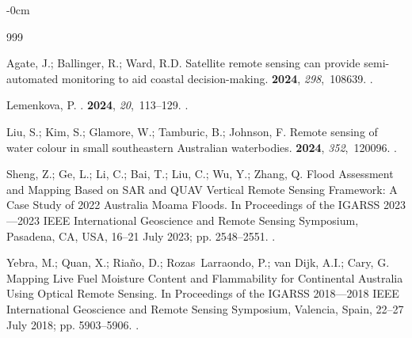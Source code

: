 \documentclass[jmse,article,accept,pdftex,oneauthor]{Definitions/mdpi}
\begin{document}
\begin{adjustwidth}{-\extralength}{0cm}


%
\begin{thebibliography}{999}

Agate, J.; Ballinger, R.; Ward, R.D.
\newblock Satellite remote sensing can provide semi-automated monitoring to aid
  coastal decision-making.
 {\bf 2024}, {\em
  298},~108639.
.

Lemenkova, P.
.
 {\bf 2024}, {\em 20},~113--129.
.

Liu, S.; Kim, S.; Glamore, W.; Tamburic, B.; Johnson, F.
\newblock Remote sensing of water colour in small southeastern Australian
  waterbodies.
 {\bf 2024}, {\em
  352},~120096.
.

Sheng, Z.; Ge, L.; Li, C.; Bai, T.; Liu, C.; Wu, Y.; Zhang, Q.
\newblock Flood Assessment and Mapping Based on SAR and QUAV Vertical Remote
  Sensing Framework: A Case Study of 2022 Australia Moama Floods.
\newblock In Proceedings of the IGARSS 2023---2023 IEEE International
  Geoscience and Remote Sensing Symposium, Pasadena, CA, USA, 16--21 July 2023; pp. 2548--2551.
.

Yebra, M.; Quan, X.; Riaño, D.; Rozas~Larraondo, P.; van Dijk, A.I.; Cary, G.
\newblock Mapping Live Fuel Moisture Content and Flammability for Continental
  Australia Using Optical Remote Sensing.
\newblock In Proceedings of the IGARSS 2018---2018 IEEE International
  Geoscience and Remote Sensing Symposium, Valencia, Spain, 22--27 July 2018; pp. 5903--5906.
.


\end{thebibliography}
\end{adjustwidth}
\end{document}
